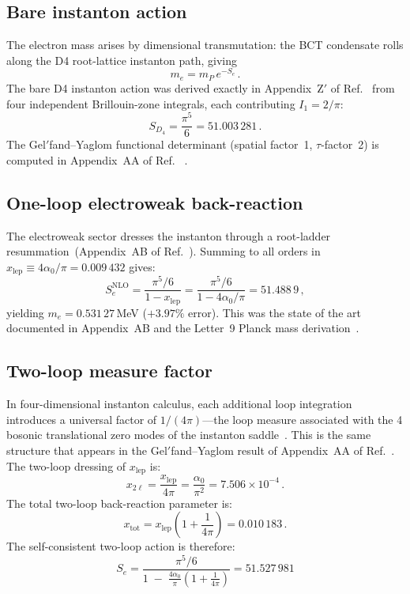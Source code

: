 \documentclass[twocolumn,10pt,a4paper]{article}
\begin{document}
\subsection*{Bare instanton action}
The electron mass arises by dimensional transmutation: the BCT condensate
rolls along the D4 root-lattice instanton path, giving
\begin{equation}
  m_e = m_P\,e^{-S_e}\,.
  \label{eq:me_generic}
\end{equation}
The bare D4 instanton action was derived exactly in Appendix~Z$'$ of
Ref.~\cite{monograph} from four independent Brillouin-zone integrals, each
contributing $I_1 = 2/\pi$:
\begin{equation}
  S_{D_4} = \frac{\pi^5}{6} = 51.003\,281\,.
  \label{eq:SD4}
\end{equation}
The Gel$'$fand--Yaglom functional determinant (spatial factor~1,
$\tau$-factor~2) is computed in Appendix~AA of Ref.~\cite{monograph}
\cite{gelfandyaglom}.

\subsection*{One-loop electroweak back-reaction}
The electroweak sector dresses the instanton through a root-ladder
resummation~(Appendix~AB of Ref.~\cite{monograph}). Summing to all orders
in $x_\mathrm{lep} \equiv 4\alpha_0/\pi = 0.009\,432$ gives:
\begin{equation}
  S_e^\mathrm{NLO} = \frac{\pi^5/6}{1 - x_\mathrm{lep}}
  = \frac{\pi^5/6}{1 - 4\alpha_0/\pi} = 51.488\,9\,,
  \label{eq:Se_nlo}
\end{equation}
yielding $m_e = 0.531\,27$\,MeV ($+3.97\%$ error). This was the state of
the art documented in Appendix~AB and the Letter~9 Planck mass
derivation~\cite{planck}.

\subsection*{Two-loop measure factor}
In four-dimensional instanton calculus, each additional loop integration
introduces a universal factor of $1/(4\pi)$---the loop measure associated
with the 4 bosonic translational zero modes of the instanton
saddle~\cite{thooft76,zinnjustin}. This is the same structure that
appears in the Gel$'$fand--Yaglom result of Appendix~AA of
Ref.~\cite{monograph}. The two-loop dressing of $x_\mathrm{lep}$ is:
\begin{equation}
  x_{2\ell} = \frac{x_\mathrm{lep}}{4\pi}
  = \frac{\alpha_0}{\pi^2} = 7.506\times10^{-4}\,.
  \label{eq:x2loop}
\end{equation}
The total two-loop back-reaction parameter is:
\begin{equation}
  x_\mathrm{tot} = x_\mathrm{lep}\!\left(1 + \frac{1}{4\pi}\right)
  = 0.010\,183\,.
  \label{eq:xtot}
\end{equation}
The self-consistent two-loop action is therefore:
\begin{equation}
\boxed{
  S_e = \frac{\pi^5/6}{\displaystyle 1 \;-\;
  \frac{4\alpha_0}{\pi}\!\left(1 + \frac{1}{4\pi}\right)}
  = 51.527\,981
  }
  \label{eq:Se_final}
\end{equation}
\end{document}

